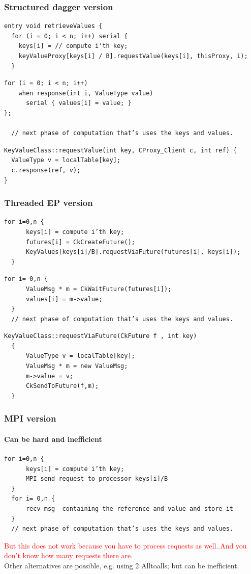 \documentclass{beamer}
\begin{document}
\begin{frame}[fragile]
  \frametitle{Structured dagger version}
  \begin{lstlisting}[basicstyle=\footnotesize]
entry void retrieveValues {
  for (i = 0; i < n; i++) serial {
    keys[i] = // compute i'th key;
    keyValueProxy[keys[i] / B].requestValue(keys[i], thisProxy, i);
  }
  \end{lstlisting}
  \pause
  \begin{lstlisting}[basicstyle=\footnotesize]
  for (i = 0; i < n; i++)
    when response(int i, ValueType value)
      serial { values[i] = value; }
};

  // next phase of computation that’s uses the keys and values.
  \end{lstlisting}
  \pause
  \begin{lstlisting}[basicstyle=\footnotesize]
KeyValueClass::requestValue(int key, CProxy_Client c, int ref) {
  ValueType v = localTable[key];
  c.response(ref, v);
}
  \end{lstlisting}
\end{frame}

\begin{frame}[fragile]

  \frametitle{Threaded EP version}

  \begin{lstlisting}[basicstyle=\footnotesize]
  for i=0,n {
      keys[i] = compute i’th key;
      futures[i] = CkCreateFuture();
      KeyValues[keys[i]/B].requestViaFuture(futures[i], keys[i]); 
  }
  \end{lstlisting}
  \pause
  \begin{lstlisting}[basicstyle=\footnotesize]
  for i= 0,n {
      ValueMsg * m = CkWaitFuture(futures[i]);
      values[i] = m->value;
  }
  // next phase of computation that’s uses the keys and values.
  \end{lstlisting}
  \pause
  \begin{lstlisting}[basicstyle=\footnotesize]
  KeyValueClass::requestViaFuture(CkFuture f , int key)
  {  
      ValueType v = localTable[key];
      ValueMsg * m = new ValueMsg;
      m->value = v;
      CkSendToFuture(f,m);
  }
  \end{lstlisting}
\end{frame}

\begin{frame}[fragile]

  \frametitle{MPI version}
  \framesubtitle{Can be hard and inefficient}

  \begin{lstlisting}[basicstyle=\footnotesize]
  for i=0,n {
      keys[i] = compute i’th key; 
      MPI send request to processor keys[i]/B
  }
  for i= 0,n {
      recv msg  containing the reference and value and store it
  }
  // next phase of computation that’s uses the keys and values.
  \end{lstlisting}
  \pause
  \textcolor{red}{But this does not work because you have to process 
  requests as well..And you don’t know how many requests there are.}
  \pause
  \\
  \vspace{.2cm}
  Other alternatives are possible, e.g. using 2 Alltoalls; but can be inefficient.
\end{frame}
\end{document}
